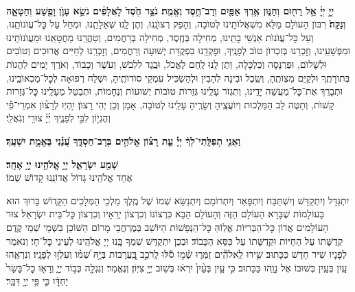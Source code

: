 \documentclass[twoside, openany, parskip=half, 11pt]{book}
\begin{document}
\begin{sometimes}

\\
 \textbf{יְיָ֣ יְיָ֔ אֵ֥ל רַח֖וּם וְחַנּ֑וּן אֶ֥רֶךְ אַפַּ֖יִם וְרַב־חֶ֥סֶד וֶאֱמֶֽת׃ נֹצֵ֥ר חֶ֙סֶד֙ לָאֲלָפִ֔ים נֹשֵׂ֥א עָוֺ֛ן וָפֶ֖שַׁע וְחַטָּאָ֑ה וְנַקֵּה֙׃}
רִבּוֺן הָעוׂלָם מַלֵּא מִשְׁאֲלוׂתֵֽינוּ לְטוׂבָה, וְהָפֵק רְצוׂנֵֽנוּ, וְתֶן לָֽנוּ שְׁאֵלָתֵֽנוּ, וּמְחַל עַל כׇּל־עֲוׂנוׂתֵֽנוּ, וְעַל כׇּל־עֲוׂנוׂת אַנְשֵׁי בׇתֵּֽינוּ, מְחִילָה בְּחֶֽסֶד, מְחִילָה בְּרַחֲמִים, וְטַהֲרֵֽנוּ מֵחֲטָאֵֽנוּ וּמֵעֲוׂנוׂתֵֽינוּ וּמִפְּשָׁעֵֽינוּ, וְזׇכְרֵנוּ בְּזִכְרוׂן טוׂב לְפָנֶֽיךָ, וּפׇקְדֵֽנוּ בִּפְקֻדַּת יְשׁוּעָה וְרַחֲמִים, וְזׇכְרֵֽנוּ לְחַיִּים אֲרוּכִים וְטוׂבִים וּלְשָׁלוׂם, וּפַרְנָסָה וְכַלְכָּלָה, וְתֶן לָֽנוּ לֶֽחֶם לֶאֱכׂל, וּבֶֽגֶד לִלְבּׂשׁ, וְעׂשֶׁר וְכָבוׂד, וְאׂרֶךְ יָמִים לַהֲגוׂת בְּתוׂרָתֶֽךָ וּלְקַיֵּם מִצְוׂתֶֽהָ, וְשֵֽׂכֶל וּבִינָה לְהָבִין וּלְהַשְׂכִּיל עִמְקֵי סוׂדוׂתֶֽיהָ, וּשְׁלַח רְפוּאָה לְכׇל־מַכְאוׂבֵֽינוּ, וּתְבָרֵךְ אֶת־כׇּל־מַעֲשֵׁה יָדֵֽינוּ, וְתִגְזׂר עָלֵֽינוּ גְּזֵרוׂת טוׂבוׂת יְשׁוּעוׂת וְנֶחָמוׂת, וּתְבַטֵּל מֵעָלֵֽינוּ כׇּל־גְּזֵרוׂת קָשׁוׂת, וְתַטֶּה לֵב הַמַּלְכוּת וְיוׂעֲצֶֽיהָ וְשָׂרֶֽיהָ עָלֵֽינוּ לְטוׂבָה, אָמֵן וְכֵן יְהִי רָצוׂן׃
%
יִ֥הְיֽוּ לְרָצ֨וֹן אִמְרֵי־פִ֡י וְהֶגְי֣וֹן לִבִּ֣י לְפָנֶ֑יךָ יְ֜יָ֗ צוּרִ֥י וְגֹֽאֲלִֽי׃


\textbf{וַאֲנִ֤י תְפִלָּֽתִי־לְךָ֨ יְיָ֡ עֵ֤ת רָצ֗וֹן אֱלֹהִ֥ים בְּרָב־חַסְדֶּ֑ךָ עֲ֝נֵ֗נִי בֶּאֱמֶ֥ת יִשְׁעֶֽךָ׃}

\end{sometimes}

\brikhshmei

\textbf{שְׁמַ֖ע יִשְׂרָאֵ֑ל יְיָ֥ אֱלֹהֵ֖ינוּ יְיָ֥ אֶחָֽד׃}\\

אֶחָד אֱלֹהֵֽינוּ גָּדוֹל אֲדוֹנֵֽנוּ קָדוֹשׁ שְׁמוֹ׃

\gadlu

\label{al hakol}
יִתְגַּדַּל וְיִתְקַדַּשׁ וְיִשְׁתַּבַּח וְיִתְפָּאַר וְיִתְרוֹמַם וְיִתְנַשֵּׂא שְׁמוֹ שֶׁל מֶֽלֶךְ מַלְכֵי הַמְּלָכִים הַקְָּדוֹשׁ בָּרוּךְ הוּא בָּעוֹלָמוֹת שֶׁבָּרָא הָעוֹלָם הַזֶּה וְהָעוֹלָם הַבָּא כִּרְצוֹנוֹ וְכִרְצוֹן יְרֵאָיו וְכִרְצוֹן כׇּל־בֵּית יִשְׂרָאֵל׃ צוּר הָעוֹלָמִים אֲדוֹן כׇּל־הַבְּרִיּוֹת אֱלֽוֹהַּ כׇּל־הַנְּפָשׁוֹת הַיּוֹשֵׁב בְּמֶרְחֲבֵי מָרוֹם הַשּׁוֹכֵן בִּשְׁמֵי שְׁמֵי קֶֽדֶם׃ קְדֻשָּׁתוֹ עַל הַחַיּוֹת וּקְדֻשָּׁתוֹ עַל כִּסֵּא הַכָּבוֹד׃ וּבְכֵן יִתְקַדַּשׁ שִׁמְךָ בָּֽנוּ יְיָ אֱלֹהֵֽינוּ לְעֵינֵי כׇּל־חָי׃ וְנֹאמַר לְפָנָיו שִׁיר חָדָשׁ כַּכָּתוּב׃
שִׁ֥ירוּ לֵֽאלֹהִֽ֘ים זַמְּר֢וּ שְׁ֫מ֥וֹ סֹ֡לּוּ לָֽרֹכֵ֣ב בָּֽ֭עֲרָבוֹת בְּיָ֥הּ שְׁ֝מ֗וֹ וְעִלְז֥וּ לְפָנָֽיו׃ וְנִרְאֵֽהוּ עַֽיִן בְּעַֽיִן בְּשׁוּבוֹ אֶל נָוֵֽהוּ כַּכָּתוּב׃
%
כִּ֣י עַ֤יִן בְּעַ֨יִן֙ יִרְא֔וּ בְּשׁ֥וּב יְיָ֖ צִיּֽוֹן׃ וְנֶאֱמַר׃
וְנִגְלָ֖ה כְּב֣וֹד יְיָ֑ וְרָא֤וּ כׇל־בָּשָׂר֙ יַחְדָּ֔ו כִּ֛י פִּ֥י יְיָ֖ דִּבֵּֽר׃
\end{document}
